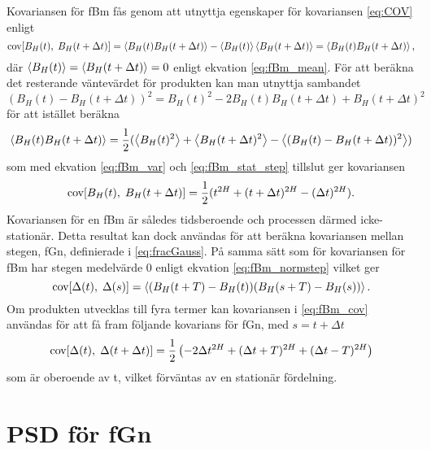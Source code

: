 Kovariansen för fBm fås genom att utnyttja egenskaper för kovariansen \eqref{eq:COV} enligt
\begin{equation}
    \COV{B_H(t)}{B_H(t+\Delta{t})}=\ev{B_H(t)B_H(t+\Delta{t})}-\ev{B_H(t)}\ev{B_H(t+\Delta{t})}=\ev{B_H(t)B_H(t+\Delta{t})},
\end{equation}
där $\ev{B_H(t)}=\ev{B_H(t+\Delta{t})}=0$ enligt ekvation \eqref{eq:fBm_mean}. För att beräkna det resterande väntevärdet för produkten kan man utnyttja sambandet $(B_H(t)-B_H(t+\Delta{t}))^2=B_H(t)^2 -2B_H(t)B_H(t+\Delta{t})+B_H(t+\Delta{t})^2$ för att istället beräkna
\begin{equation}
    \ev{B_H(t)B_H(t+\Delta{t})}=\frac{1}{2}(\ev{B_H(t)^2}+\ev{B_H(t+\Delta{t})^2}-\ev{(B_H(t)-B_H(t+\Delta{t}))^2}) 
\end{equation}
som med ekvation \eqref{eq:fBm_var} och \eqref{eq:fBm_stat_step} tillslut ger kovariansen
\begin{equation} \label{eq:fBm_cov}
    \text{cov}\!\left[B_H(t),\;B_H(t+\Delta{t})\right] = \frac{1}{2}(t^{2H}+(t+\Delta{t})^{2H}-(\Delta{t})^{2H}).
\end{equation}
Kovariansen för en fBm är således tidsberoende och processen därmed icke-stationär. Detta resultat kan dock användas för att beräkna kovariansen mellan stegen, fGn, definierade i \eqref{eq:fracGauss}. På samma sätt som för kovariansen för fBm har stegen medelvärde 0 enligt ekvation \eqref{eq:fBm_normstep} vilket ger
\begin{equation}
    \COV{\Delta(t)}{\Delta(s)} = \ev{(B_H(t+T)-B_H(t))(B_H(s+T)-B_H(s))}.
\end{equation}
Om produkten utvecklas till fyra termer kan kovariansen i \eqref{eq:fBm_cov} användas för att få fram följande kovarians för fGn, med $s=t+\Delta{t}$
\begin{equation} \label{eq:fGn_cov}
    \text{cov}\!\left[\Delta(t),\;\Delta(t+\Delta{t})\right] = \frac{1}{2}\left(-2\Delta{t}^{2H}+(\Delta{t}+T)^{2H}+(\Delta{t}-T)^{2H}\right)
\end{equation}
som är oberoende av t, vilket förväntas av en stationär fördelning.



\section{PSD för fGn}

